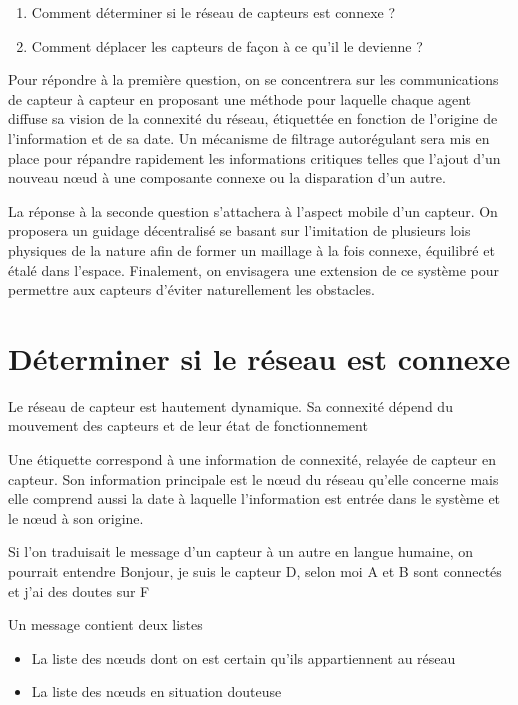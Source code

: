 \documentclass[10pt]{article}
\begin{document}
\begin{multicols}{2}
\begin{enumerate}
\item{Comment déterminer si le réseau de capteurs est connexe ?}
\item{Comment déplacer les capteurs de façon à ce qu'il le devienne ?}
\end{enumerate}

Pour répondre à la première question, on se concentrera sur les
communications de capteur à capteur en proposant une méthode pour
laquelle chaque agent diffuse sa vision de la connexité du réseau,
étiquettée en fonction de l'origine de l'information et de sa date. Un
mécanisme de filtrage autorégulant sera mis en place pour
répandre rapidement les informations critiques telles que l'ajout d'un
nouveau n\oe ud à une composante connexe ou la disparation d'un autre.

La réponse à la seconde question s'attachera à l'aspect mobile d'un
capteur. On proposera un guidage décentralisé se basant sur
l'imitation de plusieurs lois physiques de la nature afin de former un
maillage à la fois connexe, équilibré et étalé dans
l'espace. Finalement, on envisagera une extension de ce système pour
permettre aux capteurs d'éviter naturellement les obstacles.

\section{Déterminer si le réseau est connexe}

Le réseau de capteur est hautement dynamique. Sa connexité dépend du
mouvement des capteurs et de leur état de fonctionnement

Une étiquette correspond à une information de connexité, relayée de
capteur en capteur. Son information principale est le n\oe ud du
réseau qu'elle concerne mais elle comprend aussi la date à laquelle
l'information est entrée dans le système et le n\oe ud à son origine.

Si l'on traduisait le message d'un capteur à un autre en langue
humaine, on pourrait entendre Bonjour, je suis le capteur D, selon moi
A et B sont connectés et j'ai des doutes sur F

Un message contient deux listes

\begin{itemize}
\item{La liste des n\oe uds dont on est certain qu'ils appartiennent
  au réseau}
\item{La liste des n\oe uds en situation douteuse}
\end{itemize}


\end{multicols}
\end{document}
